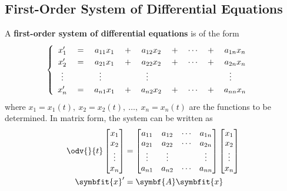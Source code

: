 \documentclass{article}
\begin{document}
\subsection{First-Order System of Differential Equations}
\begin{definition}
    A \textbf{first-order system of differential equations} is of the
    form
    \begin{equation*}
        \begin{cases}
            \begin{array}{ c >{{}}c<{{}} c >{{}}c<{{}} c >{{}}c<{{}} c >{{}}c<{{}} c  }
                x'_1               & = & a_{11}x_1                         & + & a_{12}x_2                         & + & \cdots & + & a_{1n}x_n                         \\
                x'_2               & = & a_{21}x_1                         & + & a_{22}x_2                         & + & \cdots & + & a_{2n}x_n                         \\
                \vdotswithin{x'_3} &   & \vdotswithin{a_{31}}\phantom{x_1} &   & \vdotswithin{a_{32}}\phantom{x_2} &   &        &   & \vdotswithin{a_{3n}}\phantom{x_n} \\
                x'_n               & = & a_{n1}x_1                         & + & a_{n2}x_2                         & + & \cdots & + & a_{nn}x_n
            \end{array}
        \end{cases}
    \end{equation*}
    where \(x_1=x_1(t),\: x_2=x_2(t),\: \dots,\: x_n=x_n(t)\) are the
    functions to be determined. In matrix form, the system can be
    written as
    \begin{align*}
        \odv{}{t}
        \begin{bmatrix}
            x_1    \\
            x_2    \\
            \vdots \\
            x_n
        \end{bmatrix}
                     & =
        \begin{bmatrix}
            a_{11} & a_{12} & \cdots & a_{1n} \\
            a_{21} & a_{22} & \cdots & a_{2n} \\
            \vdots & \vdots &        & \vdots \\
            a_{n1} & a_{n2} & \cdots & a_{nn}
        \end{bmatrix}
        \begin{bmatrix}
            x_1    \\
            x_2    \\
            \vdots \\
            x_n
        \end{bmatrix}                           \\
        \symbfit{x}' & = \symbf{A} \symbfit{x}
    \end{align*}
\end{definition}
\end{document}
